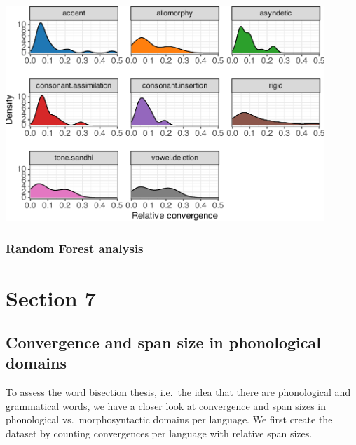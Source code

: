 \documentclass[
]{article}
\begin{document}
\begin{center}\includegraphics[width=0.9\textwidth,height=\textheight]{02_analyses_chapter17_files/figure-latex/dens crossl-1} \end{center}

\subsubsection{Random Forest analysis}\label{random-forest-analysis}

\section{Section 7}\label{section-7}

\subsection{Convergence and span size in phonological
domains}\label{convergence-and-span-size-in-phonological-domains}

To assess the word bisection thesis, i.e.~the idea that there are
phonological and grammatical words, we have a closer look at convergence
and span sizes in phonological vs.~morphosyntactic domains per language.
We first create the dataset by counting convergences per language with
relative span sizes.
\end{document}
